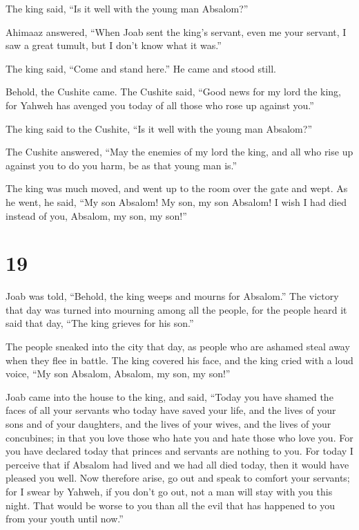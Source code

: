  The king said, ``Is it well with the young man Absalom?''

Ahimaaz answered, ``When Joab sent the king's servant, even me your
servant, I saw a great tumult, but I don't know what it was.''

 The king said, ``Come and stand here.'' He came and stood
still.

 Behold, the Cushite came. The Cushite said, ``Good news
for my lord the king, for Yahweh has avenged you today of all those who
rose up against you.''

 The king said to the Cushite, ``Is it well with the young
man Absalom?''

The Cushite answered, ``May the enemies of my lord the king, and all who
rise up against you to do you harm, be as that young man is.''

 The king was much moved, and went up to the room over the
gate and wept. As he went, he said, ``My son Absalom! My son, my son
Absalom! I wish I had died instead of you, Absalom, my son, my son!''

\hypertarget{section-18}{%
\section{19}\label{section-18}}

 Joab was told, ``Behold, the king weeps and mourns for
Absalom.''  The victory that day was turned into mourning
among all the people, for the people heard it said that day, ``The king
grieves for his son.''

 The people sneaked into the city that day, as people who
are ashamed steal away when they flee in battle.  The king
covered his face, and the king cried with a loud voice, ``My son
Absalom, Absalom, my son, my son!''

 Joab came into the house to the king, and said, ``Today you
have shamed the faces of all your servants who today have saved your
life, and the lives of your sons and of your daughters, and the lives of
your wives, and the lives of your concubines;  in that you
love those who hate you and hate those who love you. For you have
declared today that princes and servants are nothing to you. For today I
perceive that if Absalom had lived and we had all died today, then it
would have pleased you well.  Now therefore arise, go out
and speak to comfort your servants; for I swear by Yahweh, if you don't
go out, not a man will stay with you this night. That would be worse to
you than all the evil that has happened to you from your youth until
now.''

